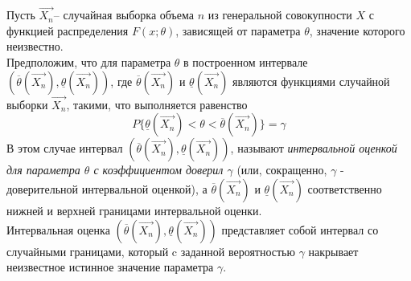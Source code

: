 \begin{defn}
	Пусть $\overrightarrow{X_n}$– случайная выборка объема $n$ из генеральной совокупности $X$ с функцией распределения $F(x;\theta)$, зависящей от параметра $\theta$, значение которого неизвестно.
	\\ Предположим, что для параметра $\theta$ в построенном интервале $(\overline\theta(\overrightarrow{X_n}), \underline\theta(\overrightarrow{X_n}))$, где $\overline\theta(\overrightarrow{X_n}) $ и $\underline\theta(\overrightarrow{X_n})$ являются функциями случайной выборки $\overrightarrow{X_n}$, такими, что выполняется равенство
	\begin{equation}P\{\underline\theta(\overrightarrow{X_n})<\theta<\overline\theta(\overrightarrow{X_n})\} = \gamma\end{equation}
	В этом случае интервал $(\overline\theta(\overrightarrow{X_n}), \underline\theta(\overrightarrow{X_n}))$, называют \emph{интервальной оценкой для параметра $\theta$ с коэффициентом доверил $\gamma$} (или, сокращенно, $\gamma$ - доверительной интервальной оценкой), а $\overline\theta(\overrightarrow{X_n}) $ и $\underline\theta(\overrightarrow{X_n})$ соответственно нижней и верхней границами интервальной оценки.\\ Интервальная оценка $(\overline\theta(\overrightarrow{X_n}), \underline\theta(\overrightarrow{X_n}))$ представляет собой интервал со случайными границами, который c заданной вероятностью $\gamma$ накрывает неизвестное истинное значение параметра $\gamma$.
\end{defn}
